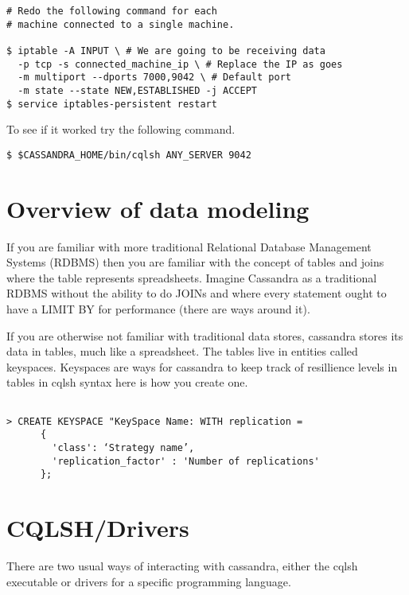 \documentclass[9pt,twocolumn,twoside]{idsi}
\begin{document}
\begin{lstlisting}[breaklines]
# Redo the following command for each
# machine connected to a single machine.

$ iptable -A INPUT \ # We are going to be receiving data
  -p tcp -s connected_machine_ip \ # Replace the IP as goes
  -m multiport --dports 7000,9042 \ # Default port
  -m state --state NEW,ESTABLISHED -j ACCEPT
$ service iptables-persistent restart
\end{lstlisting}

To see if it worked try the following command.

\begin{lstlisting}[breaklines]
$ $CASSANDRA_HOME/bin/cqlsh ANY_SERVER 9042
\end{lstlisting}


\section{Overview of data modeling}

If you are familiar with more traditional Relational Database Management Systems (RDBMS) then you are familiar with the concept of tables and joins where the table represents spreadsheets. Imagine Cassandra as a traditional RDBMS without the ability to do JOINs and where every statement ought to have a LIMIT BY for performance (there are ways around it).

If you are otherwise not familiar with traditional data stores, cassandra stores its data in tables, much like a spreadsheet. The tables live in entities called keyspaces. Keyspaces are ways for cassandra to keep track of resillience levels in tables in cqlsh syntax here is how you create one.

\begin{lstlisting}

> CREATE KEYSPACE "KeySpace Name: WITH replication = 
      {
        'class': ‘Strategy name’, 
        'replication_factor' : 'Number of replications'
      };

\end{lstlisting}


\section{CQLSH/Drivers}

There are two usual ways of interacting with cassandra, either the cqlsh executable or drivers for a specific programming language.
\end{document}
